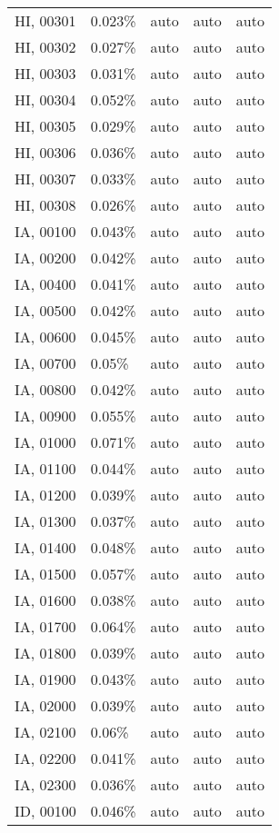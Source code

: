 \begin{longtable}[]{@{}lllll@{}}
HI, 00301 & 0.023\% & auto & auto & auto \\
HI, 00302 & 0.027\% & auto & auto & auto \\
HI, 00303 & 0.031\% & auto & auto & auto \\
HI, 00304 & 0.052\% & auto & auto & auto \\
HI, 00305 & 0.029\% & auto & auto & auto \\
HI, 00306 & 0.036\% & auto & auto & auto \\
HI, 00307 & 0.033\% & auto & auto & auto \\
HI, 00308 & 0.026\% & auto & auto & auto \\
IA, 00100 & 0.043\% & auto & auto & auto \\
IA, 00200 & 0.042\% & auto & auto & auto \\
IA, 00400 & 0.041\% & auto & auto & auto \\
IA, 00500 & 0.042\% & auto & auto & auto \\
IA, 00600 & 0.045\% & auto & auto & auto \\
IA, 00700 & 0.05\% & auto & auto & auto \\
IA, 00800 & 0.042\% & auto & auto & auto \\
IA, 00900 & 0.055\% & auto & auto & auto \\
IA, 01000 & 0.071\% & auto & auto & auto \\
IA, 01100 & 0.044\% & auto & auto & auto \\
IA, 01200 & 0.039\% & auto & auto & auto \\
IA, 01300 & 0.037\% & auto & auto & auto \\
IA, 01400 & 0.048\% & auto & auto & auto \\
IA, 01500 & 0.057\% & auto & auto & auto \\
IA, 01600 & 0.038\% & auto & auto & auto \\
IA, 01700 & 0.064\% & auto & auto & auto \\
IA, 01800 & 0.039\% & auto & auto & auto \\
IA, 01900 & 0.043\% & auto & auto & auto \\
IA, 02000 & 0.039\% & auto & auto & auto \\
IA, 02100 & 0.06\% & auto & auto & auto \\
IA, 02200 & 0.041\% & auto & auto & auto \\
IA, 02300 & 0.036\% & auto & auto & auto \\
ID, 00100 & 0.046\% & auto & auto & auto \\

\end{longtable}
